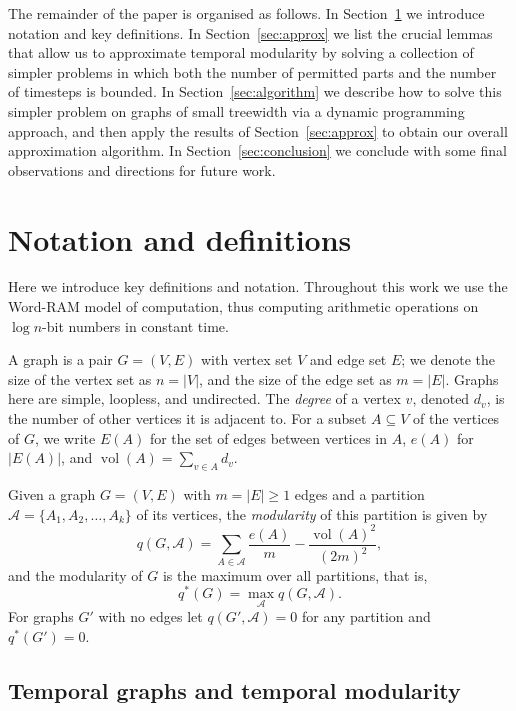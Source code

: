 \documentclass[runningheads]{llncs}
\DeclareMathOperator{\vol}{vol}
\newcommand{\cA}{\mathcal{A}}
\newcommand{\abs}[1]{\left\vert#1\right\vert}
\newcommand{\q}{q^*}
\begin{document}


The remainder of the paper is organised as follows.  In Section~\ref{sec:notation} we introduce notation and key definitions. In Section~\ref{sec:approx} we list the crucial lemmas that allow us to approximate temporal modularity by solving a collection of simpler problems in which both the number of permitted parts and the number of timesteps is bounded. In Section~\ref{sec:algorithm} we describe how to solve this simpler problem on graphs of small treewidth via a dynamic programming approach, and then apply the results of Section~\ref{sec:approx} to obtain our overall approximation algorithm. In Section~\ref{sec:conclusion} we conclude with some final observations and directions for future work. 




\section{Notation and definitions}\label{sec:notation}
Here we introduce key definitions and notation. Throughout this work we use the Word-RAM model of computation, thus computing arithmetic operations on $\log n$-bit numbers in constant time.

A graph is a pair $G = (V,E)$ with vertex set $V$ and edge set $E$; we denote the size of the vertex set as $n = |V|$, and the size of the edge set as $m = |E|$. Graphs here are simple, loopless, and undirected.  The \emph{degree} of a vertex $v$, denoted $d_v$, is the number of other vertices it is adjacent to.  For a subset $A \subseteq V$ of the vertices of $G$, we write $E(A)$ for the set of edges between vertices in $A$, $e(A)$ for $\abs{E(A)}$, and $\vol(A) = \sum_{v \in A} d_v$. 

    Given a graph $G = (V,E)$ with $m=|E|\geq 1$ edges and a partition $\cA = \{A_1,A_2,\ldots,A_k\}$ of its vertices, the \emph{modularity} of this partition is given by
    $$q(G, \cA) = \sum_{A \in \cA} \frac{e(A)}{m} - \frac{\vol(A)^2}{(2m)^2},$$
    and the modularity of $G$ is the maximum over all partitions, that is,
    $$q^*(G) = \max_{\cA} q(G,\cA).$$
    For graphs $G'$ with no edges let $q(G',\cA)=0$ for any partition and $\q(G')=0$.

\subsection{Temporal graphs and temporal modularity}
\end{document}
